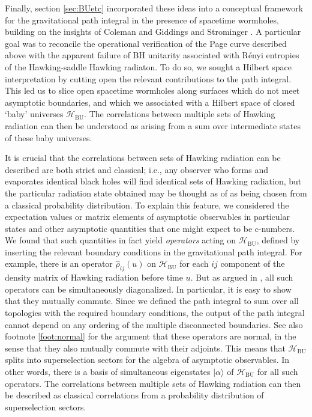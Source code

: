 \documentclass[letterpaper,12pt]{article}
\newcommand*{\hbu}{\mathcal{H}_\text{BU}} %
\begin{document}
Finally, section \ref{sec:BUetc} incorporated these ideas into a conceptual framework for the gravitational path integral in the presence of spacetime wormholes, building on the insights of Coleman and Giddings and Strominger \cite{Coleman:1988cy,Giddings:1988cx,Giddings:1988wv}. A particular goal was to reconcile the operational verification of the Page curve described above with the apparent failure of BH unitarity associated with R\'enyi entropies of the Hawking-saddle Hawking radiaton.  To do so, we sought a Hilbert space interpretation by cutting open the relevant contributions to the path integral. This led us to slice open spacetime wormholes along surfaces which do not meet asymptotic boundaries, and which we associated with a Hilbert space of closed `baby' universes $\hbu$. The correlations between multiple sets of Hawking radiation can then be understood as arising from a sum over intermediate states of these baby universes.

It is crucial that the correlations between sets of Hawking radiation can be described are both strict and classical; i.e., any observer who forms and evaporates identical black holes will find identical sets of Hawking radiation, but the particular radiation state obtained may be thought as of as being chosen from a classical probability distribution.  To explain this feature, we considered the expectation values or matrix elements of asymptotic observables in particular states and other asymptotic quantities that one might expect to be c-numbers.  We found that such quantities in fact yield {\it operators} acting on $\hbu$, defined by inserting the relevant boundary conditions in the gravitational path integral. For example, there is an operator $\hat{\rho}_{ij}(u)$ on $\hbu$ for each $ij$ component of the density matrix of Hawking radiation before time $u$. But as argued in \cite{Marolf:2020xie}, all such operators can be simultaneously diagonalized.  In particular, it is easy to show that they
mutually commute.  Since we defined the path integral to sum over all topologies with the required boundary conditions, the output of the path integral cannot  depend on any ordering of the multiple disconnected boundaries.  See also footnote \ref{foot:normal} for the argument that these operators are normal, in the sense that they also mutually commute with their adjoints.  This means that $\hbu$ splits into superselection sectors for the algebra of asymptotic observables.  In other words,  there is a basis of simultaneous eigenstates $\big |\alpha \big \rangle$ of $\hbu$ for all such operators. The correlations between multiple sets of Hawking radiation can then be described as classical correlations from a probability distribution of superselection sectors.
\end{document}
